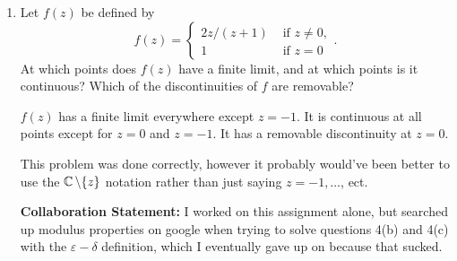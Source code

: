 \begin{enumerate}
\begin{enumerate}
	\item $f(z) = \frac{\overline{z}-z^3}{(2z-i)^4}, \quad z_0 = i$
	\begin{proof}
		We want to show that $f(z)$ exits as a composition of continuous functions at $i$. \gline{}
		First, consider that $(2z-i)^4$ is trivially continuous at all values. It is only zero when $z = \frac{i}2$, so we do not run into an issue at $z = i$.\gline{}
		Then, consider that $\bar z - z^3$ is also continuous because it is an arithmetic operation of two continuous functions: $g(z) = \bar z$, and $k(z) = z^3$. \gline{}
		Thus, because $f(z)$ is a composition of continuous functions, $f(z)$ is continuous, and thus must also be continuous at $z_0 = i$. \gline{}
		At $i$, $f(i) = 0$. 
	\end{proof}
	\begin{grade}
		3/3 points. It turns out I ddi all of this one correctly (I think), as I just showed each was a composition of continuous functions and called it a day. 
	\end{grade}
\end{enumerate}

\item Let $f(z)$ be defined by
	\[f(z) = \begin{cases} 2z/(z+1) &\text{ if } z\neq 0,\\ 1 &\text{ if } z=0 \end{cases}. \]
	At which points does $f(z)$ have a finite limit, and at which points is it continuous? Which of the discontinuities of $f$ are removable?
	\begin{problem}
		$f(z)$ has a finite limit everywhere except $z  = -1$. \gline{}
		It is continuous at all points except for $z =0$ and $z = -1$.\gline{}
		It has a removable discontinuity at $z = 0$. 
	\end{problem}
	\begin{grade}
		This problem was done correctly, however it probably would've been better to use the $\mathbb{C}\,\backslash \{z\}$ notation rather than just saying $z = -1,\ldots$, ect. 
	\end{grade}

\begin{reflection}
	\textbf{Collaboration Statement: }I worked on this assignment alone, but searched up modulus properties on google when trying to solve questions 4(b) and 4(c) with the $\varepsilon-\delta$ definition, which I eventually gave up on because that sucked. 
\end{reflection}
\end{enumerate}




